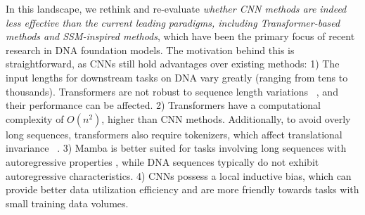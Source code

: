 In this landscape, we rethink and re-evaluate \textit{whether CNN methods are indeed less effective than the current leading paradigms, including Transformer-based methods and SSM-inspired methods}, which have been the primary focus of recent research in DNA foundation models. The motivation behind this is straightforward, as CNNs still hold advantages over existing methods: 1) The input lengths for downstream tasks on DNA vary greatly (ranging from tens to thousands). Transformers are not robust to sequence length variations ~\citep{press2021train}, and their performance can be affected. 2) Transformers have a computational complexity of $\mathit{O}(n^2)$, higher than CNN methods. Additionally, to avoid overly long sequences, transformers also require tokenizers, which affect translational invariance ~\citep{zhou2023dnabert}. 3) Mamba \citep{gu2023mamba} is better suited for tasks involving long sequences with autoregressive properties \citep{yu2024mambaout}, while DNA sequences typically do not exhibit autoregressive characteristics. 4) CNNs possess a local inductive bias, which can provide better data utilization efficiency and are more friendly towards tasks with small training data volumes.

